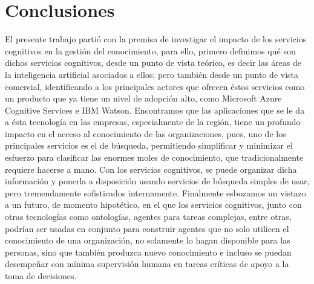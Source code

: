 \section{Conclusiones}
El presente trabajo partió con la premisa de investigar el impacto de los servicios cognitivos en la gestión del conocimiento, para ello, primero definimos qué son dichos servicios cognitivos, desde un punto de vista teórico, es decir las áreas de la inteligencia artificial asociados a ellos; pero también desde un punto de vista comercial, identificando a los principales actores que ofrecen éstos servicios como un producto que ya tiene un nivel de adopción alto, como Microsoft Azure Cognitive Services e IBM Watson.
Encontramos que las aplicaciones que se le da a ésta tecnología en las empresas, especialmente de la región, tiene un profundo impacto en el acceso al conocimiento de las organizaciones, pues, uno de los principales servicios es el de búsqueda, permitiendo simplificar y minimizar el esfuerzo para clasificar las enormes moles de conocimiento, que tradicionalmente requiere hacerse a mano. Con los servicios cognitivos, se puede organizar dicha información y ponerla a disposición usando servicios de búsqueda simples de usar, pero tremendamente sofisticados internamente.
Finalmente esbozamos un vistazo a un futuro, de momento hipotético, en el que los servicios cognitivos, junto con otras tecnologías como ontologías, agentes para tareas complejas, entre otras, podrían ser usadas en conjunto para construir agentes que no solo utilicen el conocimiento de una organización, no solamente lo hagan disponible para las personas, sino que también produzca nuevo conocimiento e incluso se puedan desempeñar con mínima supervisión humana en tareas críticas de apoyo a la toma de decisiones. 